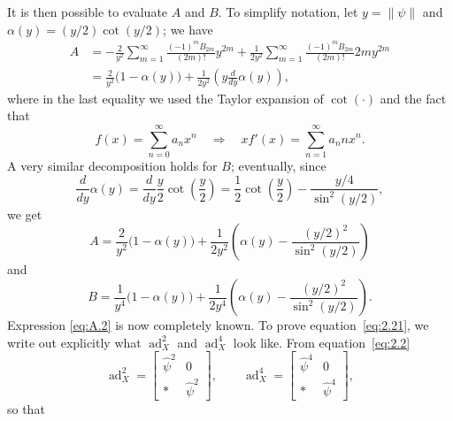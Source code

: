 \documentclass[11pt]{article}
\newcommand{\ad}{\operatorname{ad}}
\begin{document}
It is then possible to evaluate $A$ and $B$. To simplify notation, let $y=\|\psi\|$ and $\alpha(y)=(y/2)\cot(y/2)$; we have
\begin{align*}
A
&=-\frac{2}{y^2}\sum_{m=1}^{\infty}\frac{(-1)^mB_{2m}}{(2m)!}y^{2m}
+\frac{1}{2y^2}\sum_{m=1}^{\infty}\frac{(-1)^mB_{2m}}{(2m)!}2m y^{2m}\\
&=\frac{2}{y^2}\bigl(1-\alpha(y)\bigr)
+\frac{1}{2y^2}\left(y\frac{d}{dy}\alpha(y)\right),
\end{align*}
where in the last equality we used the Taylor expansion of $\cot(\cdot)$ and the fact that
\begin{equation*}
f(x)=\sum_{n=0}^{\infty}a_nx^n\quad\Rightarrow\quad xf'(x)=\sum_{n=1}^{\infty}a_nnx^n.
\end{equation*}
A very similar decomposition holds for $B$; eventually, since
\begin{equation*}
\frac{d}{dy}\alpha(y)=\frac{d}{dy}\frac y2\cot\left(\frac y2\right)
=\frac12\cot\left(\frac y2\right)-\frac{y/4}{\sin^2(y/2)},
\end{equation*}
we get
\begin{equation*}
A=\frac{2}{y^2}\bigl(1-\alpha(y)\bigr)
+\frac{1}{2y^2}\left(\alpha(y)-\frac{(y/2)^2}{\sin^2(y/2)}\right)
\end{equation*}
and
\begin{equation*}
B=\frac{1}{y^4}\bigl(1-\alpha(y)\bigr)
+\frac{1}{2y^4}\left(\alpha(y)-\frac{(y/2)^2}{\sin^2(y/2)}\right).
\end{equation*}
Expression \eqref{eq:A.2} is now completely known. To prove equation~\eqref{eq:2.21}, we write out explicitly what $\ad_X^2$ and $\ad_X^4$ look like. From equation~\eqref{eq:2.2}
\begin{equation*}
\ad_X^2=\begin{bmatrix}\widehat\psi^2&0\\ *&\widehat\psi^2\end{bmatrix},
\qquad
\ad_X^4=\begin{bmatrix}\widehat\psi^4&0\\ *&\widehat\psi^4\end{bmatrix},
\end{equation*}
so that
\end{document}

